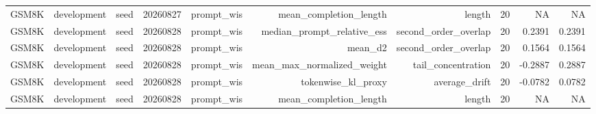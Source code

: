 \begin{table}[t]
\begin{tabular}{lrrrrrrrrr}
GSM8K & development & seed & 20260827 & prompt\_wis & mean\_completion\_length & length & 20 & NA & NA \\
GSM8K & development & seed & 20260828 & prompt\_wis & median\_prompt\_relative\_ess & second\_order\_overlap & 20 & 0.2391 & 0.2391 \\
GSM8K & development & seed & 20260828 & prompt\_wis & mean\_d2 & second\_order\_overlap & 20 & 0.1564 & 0.1564 \\
GSM8K & development & seed & 20260828 & prompt\_wis & mean\_max\_normalized\_weight & tail\_concentration & 20 & -0.2887 & 0.2887 \\
GSM8K & development & seed & 20260828 & prompt\_wis & tokenwise\_kl\_proxy & average\_drift & 20 & -0.0782 & 0.0782 \\
GSM8K & development & seed & 20260828 & prompt\_wis & mean\_completion\_length & length & 20 & NA & NA \\
\bottomrule
\end{tabular}
\end{table}

